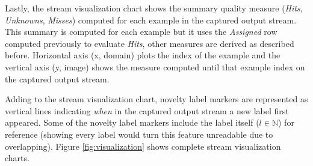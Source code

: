 Lastly, the stream visualization chart shows the summary quality measure
(\emph{Hits}, \emph{Unknowns}, \emph{Misses})
computed for each example in the captured output stream.
This summary is computed for each example but it uses the \emph{Assigned} row
computed previously to evaluate \emph{Hits}, other measures are derived as
described before.
Horizontal axis (x, domain) plots the index of the example and the
vertical axis (y, image) shows the measure computed until that example index on the captured
output stream.

Adding to the stream visualization chart, novelty label markers are represented
as vertical lines indicating \emph{when} in the captured output stream a new
label first appeared.
Some of the novelty label markers include the label itself ($l \in \mathbb{N}$)
for reference (showing every label would turn this feature unreadable due
to overlapping).
Figure \ref{fig:visualization} shows complete stream visualization charts.

